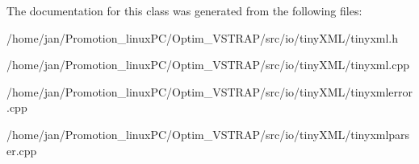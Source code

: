The documentation for this class was generated from the following files\+:\begin{DoxyCompactItemize}
\item 
/home/jan/\+Promotion\+\_\+linux\+P\+C/\+Optim\+\_\+\+V\+S\+T\+R\+A\+P/src/io/tiny\+X\+M\+L/tinyxml.\+h\item 
/home/jan/\+Promotion\+\_\+linux\+P\+C/\+Optim\+\_\+\+V\+S\+T\+R\+A\+P/src/io/tiny\+X\+M\+L/tinyxml.\+cpp\item 
/home/jan/\+Promotion\+\_\+linux\+P\+C/\+Optim\+\_\+\+V\+S\+T\+R\+A\+P/src/io/tiny\+X\+M\+L/tinyxmlerror.\+cpp\item 
/home/jan/\+Promotion\+\_\+linux\+P\+C/\+Optim\+\_\+\+V\+S\+T\+R\+A\+P/src/io/tiny\+X\+M\+L/tinyxmlparser.\+cpp\end{DoxyCompactItemize}
